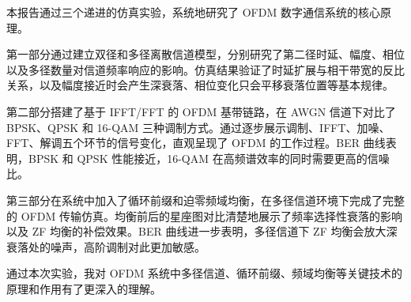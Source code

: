 \documentclass[a4paper, 11pt]{ctexart}
\begin{document}
本报告通过三个递进的仿真实验，系统地研究了 OFDM 数字通信系统的核心原理。

第一部分通过建立双径和多径离散信道模型，分别研究了第二径时延、幅度、相位以及多径数量对信道频率响应的影响。仿真结果验证了时延扩展与相干带宽的反比关系，以及幅度接近时会产生深衰落、相位变化只会平移衰落位置等基本规律。

第二部分搭建了基于 IFFT/FFT 的 OFDM 基带链路，在 AWGN 信道下对比了 BPSK、QPSK 和 16-QAM 三种调制方式。通过逐步展示调制、IFFT、加噪、FFT、解调五个环节的信号变化，直观呈现了 OFDM 的工作过程。BER 曲线表明，BPSK 和 QPSK 性能接近，16-QAM 在高频谱效率的同时需要更高的信噪比。

第三部分在系统中加入了循环前缀和迫零频域均衡，在多径信道环境下完成了完整的 OFDM 传输仿真。均衡前后的星座图对比清楚地展示了频率选择性衰落的影响以及 ZF 均衡的补偿效果。BER 曲线进一步表明，多径信道下 ZF 均衡会放大深衰落处的噪声，高阶调制对此更加敏感。

通过本次实验，我对 OFDM 系统中多径信道、循环前缀、频域均衡等关键技术的原理和作用有了更深入的理解。
\end{document}
